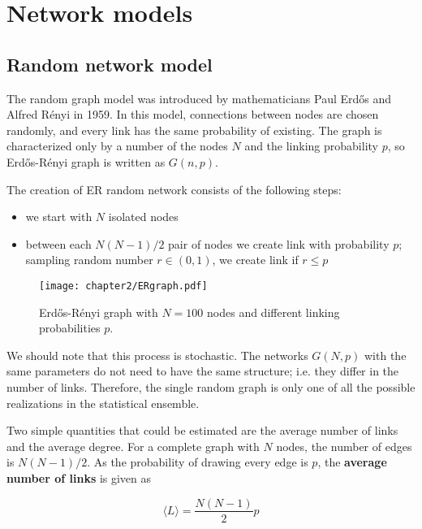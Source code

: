 \newpage
\section{Network models}

\subsection{Random network model}

The random graph model was introduced by mathematicians Paul Erdős and Alfred R\' {e}nyi in 1959. In this model, connections between nodes are chosen randomly, and every link has the same probability of existing. The graph is characterized only by a number of the nodes $N$ and the linking probability $p$, so Erdős-R\' {e}nyi graph is written as $G(n, p)$. 

The creation of ER random network consists of the following steps:
\begin{itemize}
	\item we start with $N$ isolated nodes
	\item between each $N(N-1)/2$ pair of nodes we create link with probability $p$; sampling random number $r \in (0,1)$, we create link if $r \leq p$    
\end{itemize}


\begin{figure}[H]
	\centering
	\texttt{[image: chapter2/ERgraph.pdf]}
	\caption[Erdős-R\' {e}nyi]{Erdős-R\' {e}nyi graph with $N=100$ nodes and different linking probabilities $p$.}
	\label{fig:erp}
\end{figure}

We should note that this process is stochastic. The networks $G(N, p)$ with the same parameters do not need to have the same structure; i.e. they differ in the number of links. Therefore, the single random graph is only one of all the possible realizations in the statistical ensemble. 

Two simple quantities that could be estimated are the average number of links and the average degree. For a complete graph with $N$ nodes, the number of edges is $N(N-1)/2$. As the probability of drawing every edge is $p$, the \textbf{average number of links} is given as 

\begin{equation}
\langle L \rangle = \frac{N(N-1)}{2}p
\end{equation}

